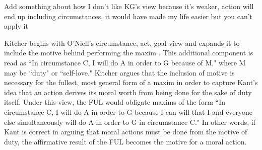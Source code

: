 %
\begin{isabellebody}%
%
%
\isadelimtheory
%
\endisadelimtheory
%
\isatagtheory
%
\endisatagtheory
{\isafoldtheory}%
%
\isadelimtheory
%
\endisadelimtheory
%
\isadelimdocument
%
\endisadelimdocument
%
\isatagdocument
%
\isamarkuptrue%
%
\isamarkuptrue%
%
\endisatagdocument
{\isafolddocument}%
%
\isadelimdocument
%
\endisadelimdocument
%
\begin{isamarkuptext}%
Add something about how I don't like KG's view because it's weaker, action will end up including
circumstances, it would have made my life easier but you can't apply it 

Kitcher begins with O'Niell's circumstance, act, goal view and expands it to include the motive 
behind performing the maxim \cite{whatisamaxim}. This additional component is read 
as ``In circumstance C, I will do A in order to G because of M," where M may be ``duty" or ``self-love."
Kitcher argues that the inclusion of motive is necessary for the fullest, most general form of a maxim
in order to capture Kant's idea that an action derives its moral worth from being done for the sake of duty itself.
Under this view, the FUL would obligate maxims of the form 
``In circumstance C, I will do A in order to G because I can will that I and everyone else simultaneously
will do A in order to G in circumstance C." In other words, if Kant is correct in arguing that moral 
actions must be done from the motive of duty, the affirmative result of the FUL becomes 
the motive for a moral action.


\end{isamarkuptext}
\end{isabellebody}
